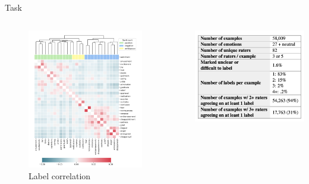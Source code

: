 \documentclass[final,20pt]{beamer}
\newlength{\onecolwid}
\begin{document}
\begin{frame}[t]
\begin{columns}[t]
\begin{column}{\onecolwid}
\begin{block}{Task}
\begin{columns}
\begin{column}{0.5\linewidth}
\begin{figure}
    \centering
    \includegraphics[width=20cm]{corr.png}
    \caption{Label correlation}
    \label{fig:corr}
\end{figure}
\end{column}
~
\begin{column}{0.4\linewidth}
\begin{table}
    \centering
    \includegraphics[width=15cm]{stat.png}

\end{table}
\end{column}
\end{columns}
\end{block}
\end{column}
\end{columns}
\end{frame}
\end{document}
